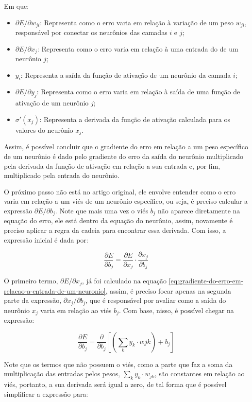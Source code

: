 Em que: 

\begin{itemize}
    \item $\partial E / \partial w_{ji}$: Representa como o erro varia em relação à variação de um peso $w_{ji}$, responsável por conectar os neurônios das camadas $i$ e $j$;
    \item $\partial E / \partial x_j$: Representa como o erro varia em relação à uma entrada do de um neurônio $j$;
    \item $y_i$: Representa a saída da função de ativação de um neurônio da camada $i$;
    \item $\partial E / \partial y_j$: Representa como o erro varia em relação à saída de uma função de ativação de um neurônio $j$;
    \item $\sigma'(x_j)$: Representa a derivada da função de ativação calculada para os valores do neurônio $x_j$.
\end{itemize}

Assim, é possível concluir que o gradiente do erro em relação a um peso específico de um neurônio é dado pelo gradiente do erro da saída do neurônio multiplicado pela derivada da função de ativação em relação a sua entrada e, por fim, multiplicado pela entrada do neurônio.

O próximo passo não está no artigo original, ele envolve entender como o erro varia em relação a um viés de um neurônio específico, ou seja, é preciso calcular a expressão $\partial E / \partial b_j$. Note que mais uma vez o viés $b_j$ não aparece diretamente na equação do erro, ele está dentro da equação do neurônio, assim, novamente é preciso aplicar a regra da cadeia para encontrar essa derivada. Com isso, a expressão inicial é dada por:

\[
    \frac{\partial E}{\partial b_j} = \frac{\partial E}{\partial x_j} \cdot \frac{\partial x_j}{\partial b_j}
\]

O primeiro termo, $\partial E / \partial x_j$, já foi calculado na equação \ref{eq:gradiente-do-erro-em-relacao-a-entrada-de-um-neuronio}, assim, é preciso focar apenas na segunda parte da expressão, $\partial x_j / \partial b_j$, que é responsável por avaliar como a saída do neurônio $x_j$ varia em relação ao viés $b_j$. Com base, nisso, é possível chegar na expressão:

\[
    \frac{\partial E}{\partial b_j} = \frac{\partial}{\partial b_j} \left[ \left( \sum_k y_k \cdot w{jk} \right) + b_j \right]
\]

Note que os termos que não possuem o viés, como a parte que faz a soma da multiplicação das entradas pelos pesos, $\sum_k y_k \cdot w_{jk}$, são constantes em relação ao viés, portanto, a sua derivada será igual a zero, de tal forma que é possível simplificar a expressão para:

